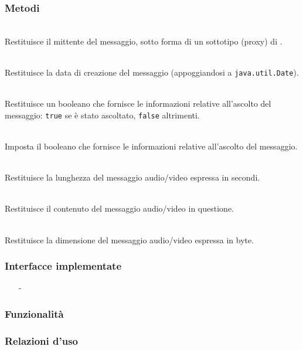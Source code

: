 \subsubsection*{Metodi}
\begin{description}
  \item{}\\
Restituisce il mittente del messaggio, sotto forma di un sottotipo (proxy) di .
  \item{}\\
Restituisce la data di creazione del messaggio (appoggiandosi a \texttt{java.util.Date}).
  \item{}\\
Restituisce un booleano che fornisce le informazioni relative all'ascolto del messaggio: \texttt{true} se è stato ascoltato, \texttt{false} altrimenti.
  \item{}\\
Imposta il booleano che fornisce le informazioni relative all'ascolto del messaggio.
  \item{}\\
Restituisce la lunghezza del messaggio audio/video espressa in secondi.
  \item{}\\
Restituisce il contenuto del messaggio audio/video in questione.
  \item{}\\
Restituisce la dimensione del messaggio audio/video espressa in byte.
\end{description}


\subsubsection*{Interfacce implementate}
\begin{itemize}[noitemsep,nolistsep]
  \item[-] 
\end{itemize}

\subsubsection*{Funzionalità}

\subsubsection*{Relazioni d'uso}

